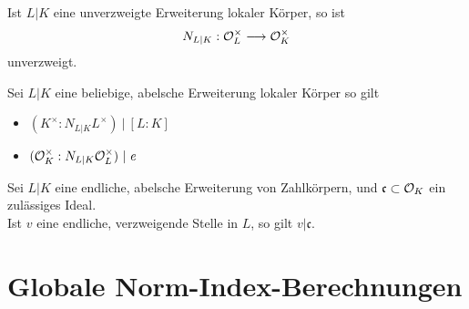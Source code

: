 \documentclass{book}
\newcommand{\cf}{\mathfrak{c}}
\begin{document}
\Kor{}
Ist $L|K$ eine unverzweigte Erweiterung lokaler Körper, so ist
\[ N_{L|K} : \mathcal{O}_L^\times \overset{}{\longrightarrow} \mathcal{O}_K^\times \]
unverzweigt.

\Kor{}
Sei $L|K$ eine beliebige, abelsche Erweiterung lokaler Körper so gilt
\begin{itemize}
\item $(K^\times : N_{L|K} L^\times ) ~|~ [L:K]$
\item $(\mathcal{O}_K^\times : N_{L|K} \mathcal{O}_L^\times ) ~|~ e$
\end{itemize}

\Bem{}
Sei $L|K$ eine endliche, abelsche Erweiterung von Zahlkörpern, und $\cf \subset \O_K$ ein zulässiges Ideal.\\
Ist $v$ eine endliche, verzweigende Stelle in $L$, so gilt $v | \cf$.

\section{Globale Norm-Index-Berechnungen}
\end{document}
